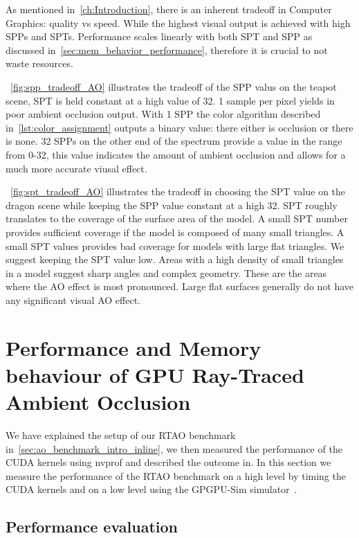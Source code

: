 As mentioned in~\autoref{ch:Introduction}, there is an inherent tradeoff in Computer Graphics: quality vs speed. While the highest visual output is achieved with high SPPs and SPTs. Performance scales linearly with both SPT and SPP as discussed in~\autoref{sec:mem_behavior_performance}, therefore it is crucial to not waste resources.

~\autoref{fig:spp_tradeoff_AO} illustrates the tradeoff of the SPP valus on the teapot scene, SPT is held constant at a high value of 32. 1 sample per pixel yields in poor ambient occlusion output. With 1 SPP the color algorithm described in~\autoref{lst:color_assignment} outputs a binary value: there either is occlusion or there is none. 32 SPPs on the other end of the spectrum provide a value in the range from 0-32, this value indicates the amount of ambient occlusion and allows for a much more accurate viusal effect. 

~\autoref{fig:spt_tradeoff_AO} illustrates the tradeoff in choosing the SPT value on the dragon scene while keeping the SPP value constant at a high 32.
SPT roughly translates to the coverage of the surface area of the model. A small SPT number provides sufficient coverage if the model is composed of many small triangles. A small SPT values provides bad coverage for models with large flat triangles.
We suggest keeping the SPT value low. Areas with a high density of small triangles in a  model suggest sharp angles and complex geometry. These are the areas where the AO effect is most pronounced. Large flat surfaces generally do not have any significant visual AO effect. 

\section{Performance and Memory behaviour of GPU Ray-Traced Ambient Occlusion} 
\label{sec:mem_behavior_performance} 

We have explained the setup of our RTAO benchmark in~\autoref{sec:ao_benchmark_intro_inline}, we then measured the performance of the CUDA kernels using nvprof and described the outcome in. In this section we measure the performance of the RTAO benchmark on a high level by timing the CUDA kernels and on a low level using the GPGPU-Sim simulator~\cite{4919648}. 

\subsection{Performance evaluation}
\label{sec:perf_eval}

